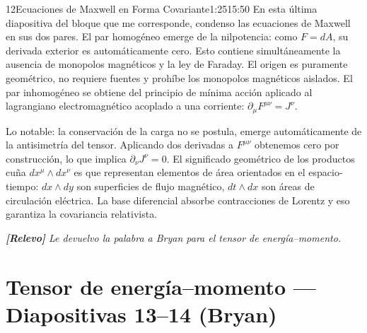 \documentclass[11pt,a4paper]{article}
\newcommand{\relevo}[1]{%
  \par\medskip
  \noindent\colorbox{tagbg}{\parbox{\dimexpr\linewidth-2\fboxsep\relax}{%
    \small\itshape \textbf{[Relevo]} #1}}\par\medskip}
\begin{document}
\begin{seborador}{12}{Ecuaciones de Maxwell en Forma Covariante}{1:25}{15:50}
En esta última diapositiva del bloque que me corresponde, condenso las
ecuaciones de Maxwell en sus dos pares. El par homogéneo emerge de la
nilpotencia: como $F=dA$, su derivada exterior es automáticamente cero. Esto
contiene simultáneamente la ausencia de monopolos magnéticos y la ley de
Faraday. El origen es puramente geométrico, no requiere fuentes y prohíbe los
monopolos magnéticos aislados. El par inhomogéneo se obtiene del principio de
mínima acción aplicado al lagrangiano electromagnético acoplado a una
corriente: $\partial_\mu F^{\mu\nu}=J^\nu$.

Lo notable: la conservación de la carga no se postula, emerge automáticamente
de la antisimetría del tensor. Aplicando dos derivadas a $F^{\mu\nu}$
obtenemos cero por construcción, lo que implica $\partial_\nu J^\nu=0$. El
significado geométrico de los productos cuña $dx^\mu\wedge dx^\nu$ es que
representan elementos de área orientados en el espacio-tiempo: $dx\wedge dy$
son superficies de flujo magnético, $dt\wedge dx$ son áreas de circulación
eléctrica. La base diferencial absorbe contracciones de Lorentz y eso
garantiza la covariancia relativista.
\relevo{Le devuelvo la palabra a Bryan para el tensor de energía--momento.}
\end{seborador}

\section{Tensor de energía--momento --- Diapositivas 13--14 (Bryan)}
\end{document}
